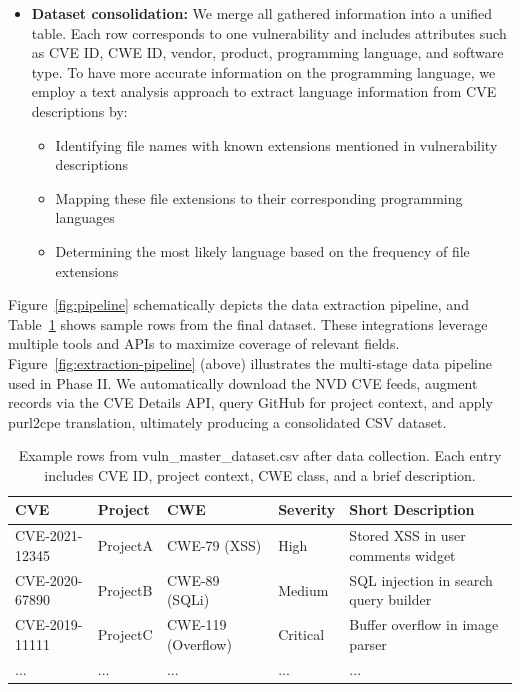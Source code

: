 \begin{itemize}
    \item \textbf{Dataset consolidation:} We merge all gathered information into a unified table. Each row corresponds to one vulnerability and includes attributes such as CVE ID, CWE ID, vendor, product, programming language, and software type. To have more accurate information on the programming language, we employ a text analysis approach to extract language information from CVE descriptions by:
    \begin{itemize}
        \item Identifying file names with known extensions mentioned in vulnerability descriptions
        \item Mapping these file extensions to their corresponding programming languages
        \item Determining the most likely language based on the frequency of file extensions
    \end{itemize}

\end{itemize}


Figure~\ref{fig:pipeline} schematically depicts the data extraction pipeline, and Table~\ref{tab:vuln-dataset} shows sample rows from the final dataset. These integrations leverage multiple tools and APIs to maximize coverage of relevant fields. 
Figure~\ref{fig:extraction-pipeline} (above) illustrates the multi-stage data pipeline used in Phase II. We automatically download the NVD CVE feeds, augment records via the CVE Details API, query GitHub for project context, and apply purl2cpe translation, ultimately producing a consolidated CSV dataset. 

\begin{table}[h!]
\centering
\caption{Example rows from vuln\_master\_dataset.csv after data collection. Each entry includes CVE ID, project context, CWE class, and a brief description.}
\label{tab:vuln-dataset}
\begin{tabular}{llllp{4cm}}
\hline
\textbf{CVE} & \textbf{Project} & \textbf{CWE} & \textbf{Severity} & \textbf{Short Description} \\
\hline
CVE-2021-12345 & ProjectA & CWE-79 (XSS) & High & Stored XSS in user comments widget \\
CVE-2020-67890 & ProjectB & CWE-89 (SQLi) & Medium & SQL injection in search query builder \\
CVE-2019-11111 & ProjectC & CWE-119 (Overflow) & Critical & Buffer overflow in image parser \\
... & ... & ... & ... & ... \\
\hline
\end{tabular}
\end{table}

